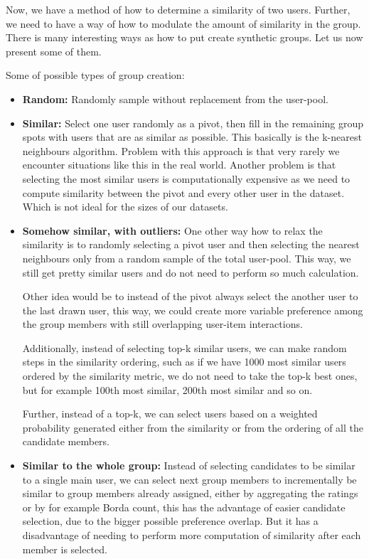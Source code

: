 Now, we have a method of how to determine a similarity of two users. Further, we need to have a way of how to modulate the amount of similarity in the group. There is many interesting ways as how to put create synthetic groups. Let us now present some of them.

Some of possible types of group creation:
\begin{itemize}
    \item \textbf{Random:}
        Randomly sample without replacement from the user-pool.
        
    \item \textbf{Similar:}
        Select one user randomly as a pivot, then fill in the remaining group spots with users that are as similar as possible. This basically is the k-nearest neighbours algorithm. Problem with this approach is that very rarely we encounter situations like this in the real world. Another problem is that selecting the most similar users is computationally expensive as we need to compute similarity between the pivot and every other user in the dataset. Which is not ideal for the sizes of our datasets.
        
    \item \textbf{Somehow similar, with outliers:}
        One other way how to relax the similarity is to randomly selecting a pivot user and then selecting the nearest neighbours only from a random sample of the total user-pool. This way, we still get pretty similar users and do not need to perform so much calculation.
        
        Other idea would be to instead of the pivot always select the another user to the last drawn user, this way, we could create more variable preference among the group members with still overlapping user-item interactions.
        
        Additionally, instead of selecting top-k similar users, we can make random steps in the similarity ordering, such as if we have 1000 most similar users ordered by the similarity metric, we do not need to take the top-k best ones, but for example 100th most similar, 200th most similar and so on.
        
        Further, instead of a top-k, we can select users based on a weighted probability generated either from the similarity or from the ordering of all the candidate members.
        
    \item \textbf{Similar to the whole group:}
        Instead of selecting candidates to be similar to a single main user, we can select next group members to incrementally be similar to group members already assigned, either by aggregating the ratings or by for example Borda count, this has the advantage of easier candidate selection, due to the bigger possible preference overlap. But it has a disadvantage of needing to perform more computation of similarity after each member is selected.
        

\end{itemize}
